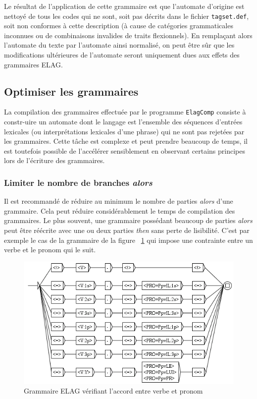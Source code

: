 \bigskip
\noindent Le résultat de l’application de cette grammaire est que l’automate d’origine est nettoyé
de tous les codes qui ne sont, soit pas décrits dans le fichier \verb$tagset.def$,
 soit non conformes
à cette description (à cause de catégories grammaticales inconnues ou de combinaisons invalides 
de traits flexionnels). En remplaçant alors l’automate du texte par l’automate ainsi
normalisé, on peut être sûr que les modifications ultérieures de l’automate seront 
uniquement dues aux effets des grammaires ELAG.


\subsection{Optimiser les grammaires}
La compilation des grammaires effectuée par le programme \verb+ElagComp+
 consiste à constr-uire un automate dont le langage est
l’ensemble des séquences d’entrées lexicales (ou interprétations lexicales d’une phrase) qui ne sont
pas rejetées par les grammaires. Cette tâche est complexe et peut prendre beaucoup de temps, il est
toutefois possible de l’accélérer sensiblement en observant certains principes lors de l’écriture
des grammaires.


\subsubsection{Limiter le nombre de branches \textit{alors}}
\noindent Il est recommandé de réduire au minimum le nombre de parties \textit{alors} d’une grammaire.
Cela peut réduire considérablement le temps de compilation des grammaires. Le plus souvent, 
une grammaire possédant beaucoup de parties \textit{alors} peut être réécrite avec une ou
deux parties \textit{then} sans perte de lisibilité. C’est par exemple le cas de la grammaire 
de la figure ~\ref{fig-NA-bad} qui impose une contrainte entre un verbe et le pronom qui le suit.

\begin{figure}[!ht]
\begin{center}
\includegraphics[width=15cm]{resources/img/fig7-21.png}
\caption{Grammaire ELAG vérifiant l’accord entre verbe et pronom\label{fig-NA-bad}}
\end{center}
\end{figure}

